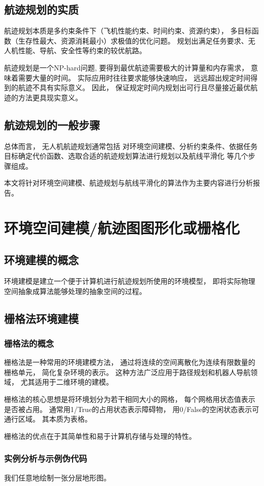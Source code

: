 \documentclass[12pt,a4paper,oneside,UTF8]{ctexart}
\begin{document}
\subsection{航迹规划的实质}
航迹规划本质是多约束条件下（飞机性能约束、时间约束、资源约束），
多目标函数（生存性最大、资源消耗最小）求极值的优化问题。
规划出满足任务要求、无人机性能、导航、安全性等约束的较优航路。

航迹规划是一个NP-hard问题,
要得到最优航迹需要极大的计算量和内存需求，
意味着需要大量的时间。
实际应用时往往要求能够快速响应，
远远超出规定时间得到的航迹不具有实际意义。
因此，
保证规定时间内规划出可行且尽量接近最优航迹的方法更具现实意义。

\subsection{航迹规划的一般步骤}
总体而言，
无人机航迹规划通常包括
对环境空间建模、分析约束条件、依据任务目标确定代价函数、选取合适的航迹规划算法进行规划以及航线平滑化
等几个步骤组成\textsuperscript{\cite{ref3}}。

本文将针对环境空间建模、航迹规划与航线平滑化的算法作为主要内容进行分析报告。
\newpage\section{环境空间建模/航迹图图形化或栅格化}
\subsection{环境建模的概念}
环境建模是建立一个便于计算机进行航迹规划所使用的环境模型，
即将实际物理空间抽象成算法能够处理的抽象空间的过程。
\subsection{栅格法环境建模}
\subsubsection{栅格法的概念}
栅格法是一种常用的环境建模方法，
通过将连续的空间离散化为连续有限数量的栅格单元，
简化复杂环境的表示。
这种方法广泛应用于路径规划和机器人导航领域，
尤其适用于二维环境的建模。

栅格法的核心思想是将环境划分为若干相同大小的网格，
每个网格用状态值表示是否被占用。
通常用1/True的占用状态表示障碍物，
用0/False的空闲状态表示可通行区域。
其本质为表格。

栅格法的优点在于其简单性和易于计算机存储与处理的特性。
\subsubsection{实例分析与示例伪代码}
我们任意地绘制一张分层地形图。
\end{document}
